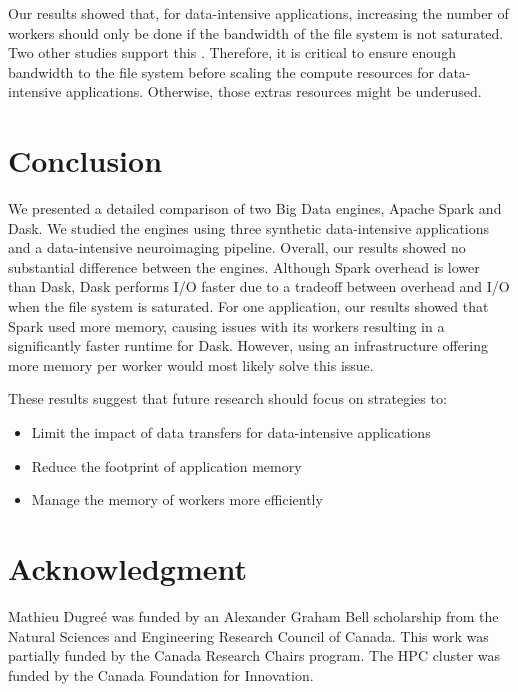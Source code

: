 \documentclass[conference]{IEEEtran}
\begin{document}
Our results showed that, for data-intensive applications, increasing the number of workers should only be done if the bandwidth of the file system is not saturated.
Two other studies support this \cite{8943502, 8588652}.
Therefore, it is critical to ensure enough bandwidth to the file system before scaling the compute resources for data-intensive applications.
Otherwise, those extras resources might be underused.

\section{Conclusion}
We presented a detailed comparison of two Big Data engines, Apache Spark and Dask.
We studied the engines using three synthetic data-intensive applications and a data-intensive neuroimaging pipeline.
Overall, our results showed no substantial difference between the engines.
Although Spark overhead is lower than Dask, Dask performs I/O faster due to a tradeoff between overhead and I/O when the file system is saturated.
For one application, our results showed that Spark used more memory, causing issues with its workers resulting in a significantly faster runtime for Dask.
However, using an infrastructure offering more memory per worker would most likely solve this issue.

These results suggest that future research should focus on strategies to:
\begin{itemize}
	\item Limit the impact of data transfers for data-intensive applications
	\item Reduce the footprint of application memory
	\item Manage the memory of workers more efficiently
\end{itemize}

\section*{Acknowledgment}
Mathieu Dugre\'e was funded by an Alexander Graham Bell scholarship from
the Natural Sciences and Engineering Research Council of Canada. This work
was partially funded by the Canada Research Chairs program. The HPC cluster
was funded by the Canada Foundation for Innovation.



\end{document}
